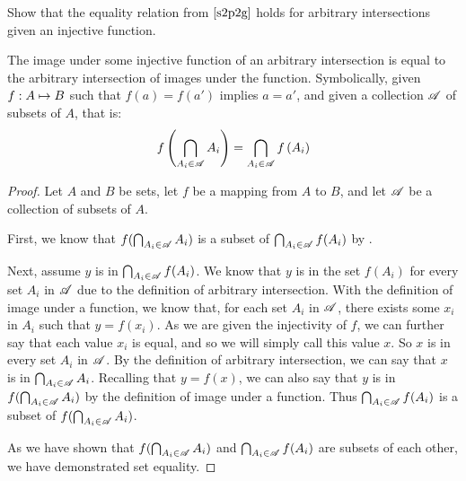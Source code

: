 \documentclass[main.tex]{subfiles}
\begin{document}
\subproblem{}\label{s2p3e}

Show that the equality relation from \(\ref{s2p2g}\) holds for arbitrary
intersections given an injective function.

\begin{thm}
	The image under some injective function of an arbitrary intersection is
	equal to the arbitrary intersection of images under the function.
	Symbolically, given \({f}: {A} \mapsto{} {B}\) such that \(f(a) = f(a')\)
	implies \(a = a'\), and given a collection \(\mathscr{A}\) of subsets of
	\(A\), that is:
	\[f\left(\bigcap\limits_{A_i \in \mathscr{A}} {A_i}\right) = \bigcap\limits_{A_i \in \mathscr{A}} {f\left(A_i\right)}\]
\end{thm}
\begin{proof}
	Let \(A\) and \(B\) be sets, let \(f\) be a mapping from \(A\) to \(B\),
	and let \(\mathscr{A}\) be a collection of subsets of \(A\).

	First, we know that
	\(f(\bigcap_{A_i \in \mathscr{A}} {A_i})\) is a subset of
	\(\bigcap_{A_i \in \mathscr{A}} {f(A_i)}\) by
	.

	Next, assume \(y\) is in
	\(\bigcap_{A_i \in \mathscr{A}} {f(A_i)}\). We know that
	\(y\) is in the set \(f(A_i)\) for every set \(A_i\) in \(\mathscr{A}\)
	due to the definition of arbitrary intersection. With the definition of
	image under a function, we know that, for each set \(A_i\) in
	\(\mathscr{A}\), there exists some \(x_i\) in \(A_i\) such that
	\(y = f(x_i)\). As we are given the injectivity of \(f\), we can further
	say that each value \(x_i\) is equal, and so we will simply call this
	value \(x\). So \(x\) is in every set \(A_i\) in \(\mathscr{A}\). By the
	definition of arbitrary intersection, we can say that \(x\) is in
	\(\bigcap_{A_i \in \mathscr{A}} {A_i}\). Recalling that
	\(y = f(x)\), we can also say that \(y\) is in
	\(f(\bigcap_{A_i \in \mathscr{A}} {A_i})\) by the
	definition of image under a function. Thus
	\(\bigcap_{A_i \in \mathscr{A}} {f(A_i)}\) is a subset of
	\(f(\bigcap_{A_i \in \mathscr{A}} {A_i})\).

	As we have shown that
	\(f(\bigcap_{A_i \in \mathscr{A}} {A_i})\) and
	\(\bigcap_{A_i \in \mathscr{A}} {f(A_i)}\) are
	subsets of each other, we have demonstrated set equality.
\end{proof}
\end{document}
